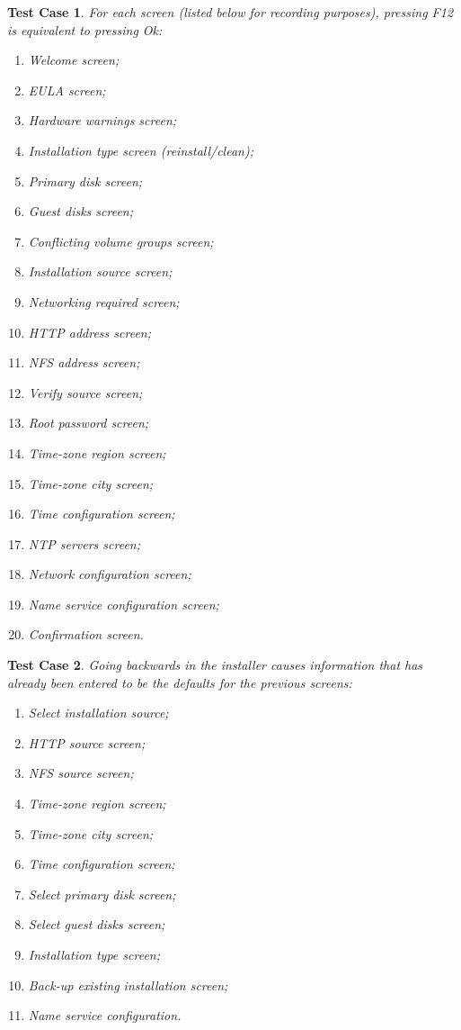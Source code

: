 \documentclass[a4paper]{article}
\newtheorem{testcase}{Test Case}
\begin{document}
\begin{testcase}
For each screen (listed below for recording purposes), pressing F12
is equivalent to pressing Ok:
\begin{enumerate}
\item Welcome screen;
\item EULA screen;
\item Hardware warnings screen;
\item Installation type screen (reinstall/clean);
\item Primary disk screen;
\item Guest disks screen;
\item Conflicting volume groups screen;
\item Installation source screen;
\item Networking required screen;
\item HTTP address screen;
\item NFS address screen;
\item Verify source screen;
\item Root password screen;
\item Time-zone region screen;
\item Time-zone city screen;
\item Time configuration screen;
\item NTP servers screen;
\item Network configuration screen;
\item Name service configuration screen;
\item Confirmation screen.
\end{enumerate}
\end{testcase}

\begin{testcase}
Going backwards in the installer causes information that has already
been entered to be the defaults for the previous screens:
\begin{enumerate}
\item Select installation source;
\item HTTP source screen;
\item NFS source screen;
\item Time-zone region screen;
\item Time-zone city screen;
\item Time configuration screen;
\item Select primary disk screen;
\item Select guest disks screen;
\item Installation type screen;
\item Back-up existing installation screen;
\item Name service configuration.
\end{enumerate}
\end{testcase}
\end{document}
